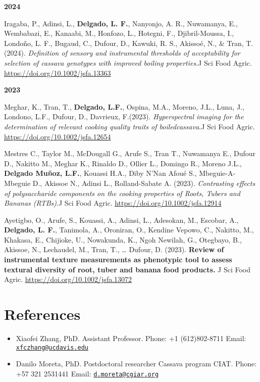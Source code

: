 \documentclass[11pt,a4paper,]{awesome-cv}
\begin{document}
\footnotesize

\setlength{\leftskip}{0cm}

\textbf{2024}

\setlength{\leftskip}{1cm}

Iragaba, P., Adinsi, L., \textbf{Delgado, L. F.}, Nanyonjo, A. R.,
Nuwamanya, E., Wembabazi, E., Kanaabi, M., Honfozo, L., Hotegni, F.,
Djibril-Moussa, I., Londoño, L. F., Bugaud, C., Dufour, D., Kawuki, R.
S., Akissoé, N., \& Tran, T.(2024). \emph{Definition of sensory and
instrumental thresholds of acceptability for selection of cassava
genotypes with improved boiling properties}.J Sci Food Agric.
\url{https://doi.org/10.1002/jsfa.13363}

\setlength{\leftskip}{0cm}

\textbf{2023}

\setlength{\leftskip}{1cm}

Meghar, K., Tran, T., \textbf{Delgado, L.F.}, Ospina, M.A., Moreno,
J.L., Luna, J., Londono, L.F., Dufour, D., Davrieux, F.(2023).
\emph{Hyperspectral imaging for the determination of relevant cooking
quality traits of boiledcassava}.J Sci Food Agric.
\url{https://doi.org/10.1002/jsfa.12654}

Mestres C., Taylor M., McDougall G., Arufe S., Tran T., Nuwamanya E.,
Dufour D., Nakitto M., Meghar K., Rinaldo D., Ollier L., Domingo R.,
Moreno J.L., \textbf{Delgado Muñoz, L.F.}, Kouassi H.A., Diby N'Nan
Afoué S., Mbeguie-A-Mbeguie D., Akissoe N., Adinsi L., Rolland-Sabate A.
(2023). \emph{Contrasting effects of polysaccharide components on the
cooking properties of Roots, Tubers and Bananas (RTBs)}.J Sci Food
Agric. \url{https://doi.org/10.1002/jsfa.12914}

Ayetigbo, O., Arufe, S., Kouassi, A., Adinsi, L., Adesokan, M., Escobar,
A., \textbf{Delgado, L. F.}, Tanimola, A., Oroniran, O., Kendine Vepowo,
C., Nakitto, M., Khakasa, E., Chijioke, U., Nowakunda, K., Ngoh Newilah,
G., Otegbayo, B., Akissoe, N., Lechaudel, M., Tran, T., \ldots{} Dufour,
D. (2023). \textbf{Review of instrumental texture measurements as
phenotypic tool to assess textural diversity of root, tuber and banana
food products.} J Sci Food Agric.
\url{https://doi.org/10.1002/jsfa.13072}

\hypertarget{references}{%
\section{References}\label{references}}

\begin{itemize}
\item
  Xiaofei Zhang, PhD. Assistant Professor. Phone: +1 (612)802-8711
  Email:
  \href{mailto:xfczhang@ucdavis.edu}{\nolinkurl{xfczhang@ucdavis.edu}}
\item
  Danilo Moreta, PhD. Postdoctoral researcher Cassava program CIAT.
  Phone: +57 321 2531441 Email:
  \href{mailto:d.moreta@cgiar.org}{\nolinkurl{d.moreta@cgiar.org}}
\end{itemize}


\label{LastPage}~
\end{document}
